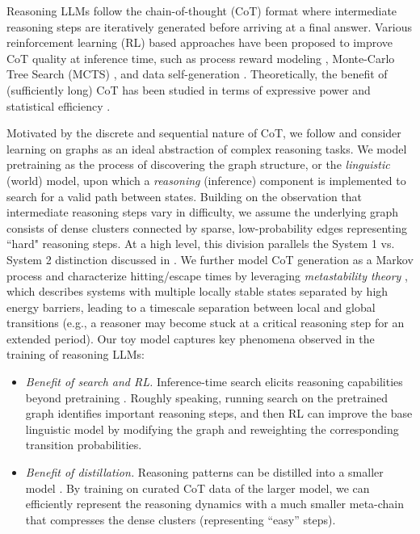 Reasoning LLMs follow the chain-of-thought (CoT) \citep{nye2021show,wei2022chain} format where intermediate reasoning steps are iteratively generated before arriving at a final answer. Various reinforcement learning (RL) based approaches \citep{bai2022constitutional} have been proposed to improve CoT quality at inference time, such as process reward modeling \citep{lightman2023let,uesato2022solving}, Monte-Carlo Tree Search (MCTS)  \citep{silver2018general,feng2023alphazero,trinh2024solving,Xie24}, and data self-generation \citep{zelikman2022star,kumar2024training}. Theoretically, the benefit of (sufficiently long) CoT has been studied in terms of expressive power and statistical efficiency \citep{merrill2023expresssive,li2024chain,kim2024transformers,wen2024sparse}. 

Motivated by the discrete and sequential nature of CoT, we follow \citet{xu2019can,sanford2024understanding,abbe2024far,besta2024graph} and consider learning on graphs as an ideal abstraction of complex reasoning tasks. We model pretraining as the process of discovering the graph structure, or the \textit{linguistic} (world) model, upon which a \textit{reasoning} (inference) component is implemented to search for a valid path between states. Building on the observation that intermediate reasoning steps vary in difficulty, we assume the underlying graph consists of dense clusters connected by sparse, low-probability edges representing ``hard" reasoning steps. At a high level, this division parallels the System 1 vs. System 2 distinction discussed in \citet{kahneman2011thinking,xiang2025towards}. We further model CoT generation as a Markov process and characterize hitting/escape times by leveraging \emph{metastability theory} \citep{Bovier02,Betz16}, which describes systems with multiple locally stable states separated by high energy barriers, leading to a timescale separation between local and global transitions (e.g., a reasoner may become stuck at a critical reasoning step for an extended period). Our toy model captures key phenomena observed in the training of reasoning LLMs:

\begin{itemize}
    \item \textit{Benefit of search and RL.} Inference-time search elicits reasoning capabilities beyond pretraining \citep{jones2021scaling,yao2024tree,snell2024scaling}. Roughly speaking, running search on the pretrained graph identifies important reasoning steps, and then RL can improve the base linguistic model by modifying the graph and reweighting the corresponding transition probabilities. 
    \item \textit{Benefit of distillation.} Reasoning patterns can be distilled into a smaller model \citep{hsieh2023distilling,gandhi2024stream,guo2025deepseek}. By training on curated CoT data of the larger model, we can efficiently represent the reasoning dynamics with a much smaller meta-chain that compresses the dense clusters (representing ``easy'' steps). 
\end{itemize}



